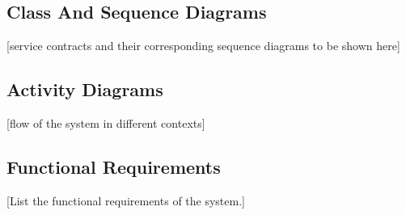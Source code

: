 \documentclass[a4paper,12pt]{article}
\begin{document}
\subsection{Class And Sequence Diagrams}
[service contracts and their corresponding sequence diagrams to be shown here]

\subsection{Activity Diagrams}
[flow of the system in different contexts]

\subsection{Functional Requirements}
[List the functional requirements of the system.]
\end{document}
